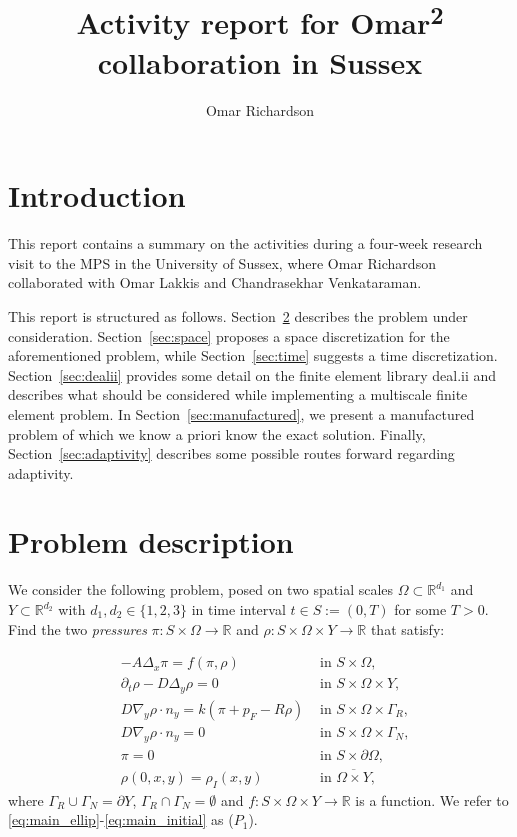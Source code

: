 \documentclass{article}
\title{Activity report for Omar\textsuperscript{2} collaboration in Sussex}
\author{Omar Richardson}
\newcommand{\R}{\mathbb{ R}}
\begin{document}
\maketitle

\section{Introduction}
This report contains a summary on the activities during a four-week research visit to the MPS in the University of Sussex, where Omar Richardson collaborated with Omar Lakkis and Chandrasekhar Venkataraman.

This report is structured as follows. Section~\ref{sec:problem} describes the problem under consideration. Section~\ref{sec:space} proposes a space discretization for the aforementioned problem, while Section~\ref{sec:time} suggests a time discretization. Section~\ref{sec:dealii} provides some detail on the finite element library deal.ii and describes what should be considered while implementing a multiscale finite element problem. In Section~\ref{sec:manufactured}, we present a manufactured problem of which we know a priori know the exact solution.
Finally, Section~\ref{sec:adaptivity} describes some possible routes forward regarding adaptivity.

\section{Problem description}
\label{sec:problem}

We consider the following problem, posed on two spatial scales $\Omega\subset \R^{d_1}$ and $Y \subset \R^{d_2}$ with $d_1,d_2 \in \{1,2,3\}$ in time interval $t\in S := (0,T)$ for some $T>0$. Find the two \emph{pressures} $\pi: S\times\Omega \to \R $ and $\rho: S\times\Omega\times Y\to \R$ that satisfy:

\begin{align}
    \label{eq:main_ellip}&-A\Delta_x\pi=f(\pi,\rho)  &\mbox{ in }S\times\Omega,\\
    \label{eq:main_para}&\partial_t\rho-D\Delta_y\rho = 0  &\mbox{ in }S\times\Omega\times Y,\\
    \label{eq:main_robin}&D\nabla_y\rho\cdot n_y= k(\pi+p_F-R\rho)&\mbox{ in } S\times\Omega\times\Gamma_R,\\
    \label{eq:main_neumann}&D\nabla_y\rho\cdot n_y=0&\mbox{ in }S\times\Omega\times\Gamma_N,\\
    \label{eq:main_dirichlet}&\pi=0 &\mbox{ in }S\times\partial\Omega,\\
    \label{eq:main_initial}&\rho(0,x,y)=\rho_I(x,y)&\mbox{ in } \overline{\Omega\times Y},
\end{align}
where $\Gamma_R \cup \Gamma_N = \partial Y$, $\Gamma_R \cap \Gamma_N = \emptyset$ and $f:S\times\Omega\times Y \to \R$ is a function. We refer to \eqref{eq:main_ellip}-\eqref{eq:main_initial} as ($P_1$).
\end{document}
